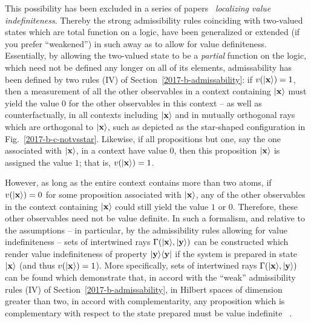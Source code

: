This possibility  has been excluded in a series of papers~\cite{Abbott:2010uq,2012-incomput-proofsCJ,PhysRevA.89.032109,2015-AnalyticKS}
{\em localizing value indefiniteness}.
Thereby the strong admissibility rules coinciding with two-valued states which are total function on a logic, have been generalized or extended (if you prefer ``weakened'')
in such away as to allow for value definiteness.
Essentially, by allowing the two-valued state to be a {\em partial} function on the logic,
which need not be defined any longer on all of its elements,
admissability has been defined by two rules (IV) of Section~\ref{2017-b-admissability}:
if $v ( \vert {\bf x} \rangle ) = 1$, then a measurement of all the other observables in a context  containing $\vert {\bf x} \rangle$  must yield
the value  $0$  for the other observables in this
context -- as well as counterfactually, in all contexts including $\vert {\bf x} \rangle$ and in mutually orthogonal rays which are orthogonal to $\vert {\bf x} \rangle$,
such as depicted as the star-shaped configuration in Fig.~\ref{2017-b-c-notvsstar}.
Likewise, if all propositions but one, say the one associated with $\vert {\bf x} \rangle$, in a context have value $0$, then this proposition $\vert {\bf x} \rangle$
is assigned the value $1$; that is,  $v ( \vert {\bf x} \rangle ) = 1$.

However,
as long as the entire context contains more than two atoms,
if  $v ( \vert {\bf x} \rangle ) = 0$ for some proposition associated with $\vert {\bf x} \rangle $,
any of the other observables in the context containing $\vert {\bf x} \rangle$ could
still yield the value $1$ or $0$.
Therefore, these other observables need not be  value definite.
In such a formalism, and relative to the assumptions -- in particular,
by the admissibility rules allowing for value indefiniteness
--
sets of intertwined rays  $\Gamma ( \vert {\bf x} \rangle , \vert {\bf y} \rangle )$
can be constructed
which render value indefiniteness of property $\vert {\bf y} \rangle  \langle {\bf y} \vert $
if the system is prepared in state $\vert {\bf x} \rangle$ (and thus $ v( \vert {\bf x} \rangle )=1$).
More specifically,
sets of intertwined rays  $\Gamma ( \vert {\bf x} \rangle , \vert {\bf y} \rangle )$
can be found which demonstrate that, in accord with the ``weak'' admissibility rules (IV)
of Section~\ref{2017-b-admissability},
in Hilbert spaces of dimension greater than two,
in accord with complementarity,
any proposition which is complementary with respect to the state prepared
must be value indefinite ~\cite{Abbott:2010uq,2012-incomput-proofsCJ,PhysRevA.89.032109,2015-AnalyticKS}.


